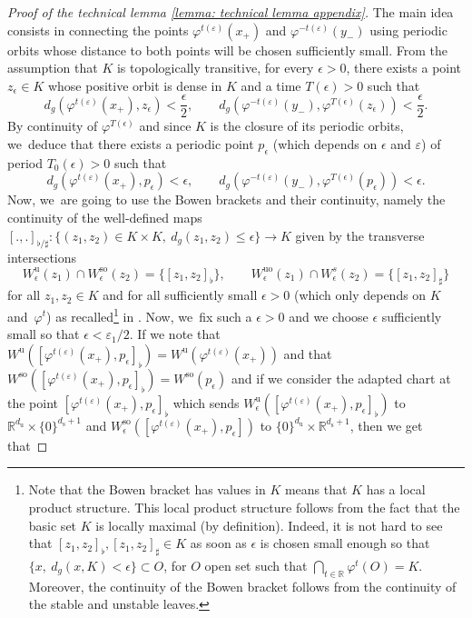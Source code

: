 \documentclass[11pt]{article}
\newcommand{\rs}{\mathrm{s}}
\newcommand{\rso}{\mathrm{so}}
\newcommand{\ru}{\mathrm{u}}
\newcommand{\ruo}{\mathrm{uo}}
\theoremstyle{definition}
\theoremstyle{plain}
\newcommand{\R}{\mathbb{R}}
\begin{document}
\begin{appendix}
\begin{proof}[Proof of the technical lemma \ref{lemma: technical lemma appendix}]
The main idea consists in connecting the points $\varphi^{ t (\varepsilon)} (x_+)$ and $\varphi^{ - t (\varepsilon)} (y_-)$ using periodic orbits whose distance to both points will be chosen sufficiently small. From the assumption that $K$ is topologically transitive, for every $\epsilon > 0$, there exists a point $z_{\epsilon} \in K$ whose positive orbit is dense in $K$ and a time $T (\epsilon) > 0$ such that
\[
d_g (\varphi^{ t (\varepsilon)} (x_+), z_{\epsilon}) < \frac{\epsilon}{2}, \qquad d_g (\varphi^{- t (\varepsilon)} (y_-), \varphi^{T (\epsilon)} (z_{\epsilon})) < \frac{\epsilon}{2}.
\]
By continuity of $\varphi^{T (\epsilon)}$ and since $K$ is the closure of its periodic orbits, we~deduce that there exists a periodic point $p_{\epsilon}$ (which depends on $\epsilon$ and $\varepsilon$) of period $T_0 (\epsilon) > 0$ such that
\[
d_g (\varphi^{ t (\varepsilon)} (x_+), p_{\epsilon}) < \epsilon, \qquad d_g (\varphi^{- t (\varepsilon)} (y_-), \varphi^{T (\epsilon)} (p_{\epsilon})) < \epsilon.
\]
Now, we~are going to use the Bowen brackets and their continuity, namely the continuity of the well-defined maps $[.,.]_{\flat / \sharp}: \{ (z_1,z_2) \in K \times K, \: d_g (z_1,z_2) \leq \epsilon\} \to K$ given by the transverse intersections
\[
W_{\epsilon}^{\ru} (z_1) \cap W_{\epsilon}^{\rso} (z_2) = \{[z_1,z_2]_{\flat} \}, \qquad W_{\epsilon}^{\ruo} (z_1) \cap W_{\epsilon}^{s} (z_2) = \{[z_1,z_2]_{\sharp} \}
\]
for all $z_1,z_2 \in K$ and for all sufficiently small $\epsilon > 0$ (which only depends on $K$ and~$\varphi^t$) as recalled\footnote{Note that the Bowen bracket has values in $K$ means that $K$ has a local product structure. This local product structure follows from the fact that the basic set $K$ is locally maximal (by definition). Indeed, it is not hard to see that $[z_1,z_2]_{\flat}, [z_1,z_2]_{\sharp} \in K$ as soon as $\epsilon$ is chosen small enough so that $\{x, \: d_g (x,K) < \epsilon \} \subset O$, for $O$ open set such that $\bigcap_{t \in \R} \varphi^t (O) = K$. Moreover, the continuity of the Bowen bracket follows from the continuity of the stable and unstable leaves.} in \cite[Prop.\,6.2.2]{FH}. Now, we~fix such a $\epsilon > 0$ and we choose $\epsilon$ sufficiently small so that $\epsilon < \varepsilon_1 /2$. If we note that $ W^{\ru} ([\varphi^{t (\varepsilon)} (x_+),p_{\epsilon}]_{\flat}) = W^{\ru} (\varphi^{t (\varepsilon)} (x_+))$ and that $ W^{\rso} ([\varphi^{t (\varepsilon)} (x_+),p_{\epsilon}]_{\flat}) = W^{\rso} (p_{\epsilon}) $ and if we consider the adapted chart at the point $[\varphi^{t (\varepsilon)} (x_+),p_{\epsilon}]_{\flat}$ which sends $ W_{\epsilon}^{\ru} ([\varphi^{t (\varepsilon)} (x_+),p_{\epsilon}]_{\flat})$ to $\R^{d_{\ru}} \times \{0\}^{d_\rs + 1}$ and $ W_{\epsilon}^{\rso} ([\varphi^{t (\varepsilon)} (x_+),p_{\epsilon}]) $ to $\{0\}^{d_{\ru}} \times \R^{d_\rs+ 1}$, then we get that

\end{proof}
\end{appendix}
\end{document}
